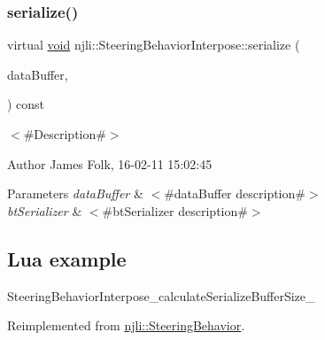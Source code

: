 \mbox{\label{classnjli_1_1_steering_behavior_interpose_acdbe12a685512be57fa5c01df5ef0769}} 
\subsubsection{\texorpdfstring{serialize()}{serialize()}}
{\footnotesize\ttfamily virtual \mbox{\hyperlink{_thread_8h_af1e856da2e658414cb2456cb6f7ebc66}{void}} njli\+::\+Steering\+Behavior\+Interpose\+::serialize (\begin{DoxyParamCaption}\item[{\mbox{\hyperlink{_thread_8h_af1e856da2e658414cb2456cb6f7ebc66}{void}} $\ast$}]{data\+Buffer,  }\item[{bt\+Serializer $\ast$}]{ }\end{DoxyParamCaption}) const\hspace{0.3cm}{\ttfamily [virtual]}}



$<$\#\+Description\#$>$ 

\begin{DoxyAuthor}{Author}
James Folk, 16-\/02-\/11 15\+:02\+:45
\end{DoxyAuthor}

\begin{DoxyParams}{Parameters}
{\em data\+Buffer} & $<$\#data\+Buffer description\#$>$ \\
\hline
{\em bt\+Serializer} & $<$\#bt\+Serializer description\#$>$\\
\hline
\end{DoxyParams}
\hypertarget{classnjli_1_1_steering_behavior_wander_ex1}{}\subsection{Lua example}\label{classnjli_1_1_steering_behavior_wander_ex1}

\begin{DoxyCodeInclude}
\end{DoxyCodeInclude}
Steering\+Behavior\+Interpose\+\_\+calculate\+Serialize\+Buffer\+Size\+\_\+ 

Reimplemented from \mbox{\hyperlink{classnjli_1_1_steering_behavior_aa8494cb4a327c0040f64cfe8b393786e}{njli\+::\+Steering\+Behavior}}.

